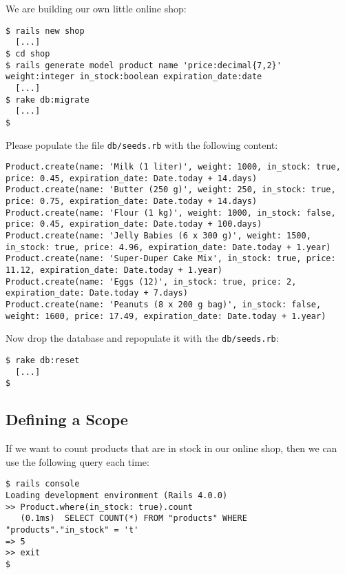 \documentclass[a4paper]{book}
\newcounter{tab}[chapter]
\begin{document}
We are building our own little online shop:

\begin{shaded}\begin{verbatim}
$ rails new shop
  [...]
$ cd shop
$ rails generate model product name 'price:decimal{7,2}' weight:integer in_stock:boolean expiration_date:date
  [...]
$ rake db:migrate
  [...]
$
\end{verbatim}\end{shaded}

Please populate the file \texttt{db/seeds.rb} with the following content:

\begin{shaded}\begin{verbatim}
Product.create(name: 'Milk (1 liter)', weight: 1000, in_stock: true, price: 0.45, expiration_date: Date.today + 14.days)
Product.create(name: 'Butter (250 g)', weight: 250, in_stock: true, price: 0.75, expiration_date: Date.today + 14.days)
Product.create(name: 'Flour (1 kg)', weight: 1000, in_stock: false, price: 0.45, expiration_date: Date.today + 100.days)
Product.create(name: 'Jelly Babies (6 x 300 g)', weight: 1500, in_stock: true, price: 4.96, expiration_date: Date.today + 1.year)
Product.create(name: 'Super-Duper Cake Mix', in_stock: true, price: 11.12, expiration_date: Date.today + 1.year)
Product.create(name: 'Eggs (12)', in_stock: true, price: 2, expiration_date: Date.today + 7.days)
Product.create(name: 'Peanuts (8 x 200 g bag)', in_stock: false, weight: 1600, price: 17.49, expiration_date: Date.today + 1.year)
\end{verbatim}\end{shaded}

Now drop the database and repopulate it with the \texttt{db/seeds.rb}:

\begin{shaded}\begin{verbatim}
$ rake db:reset
  [...]
$
\end{verbatim}\end{shaded}

\subsection{Defining a Scope}\label{defining-a-scope}

If we want to count products that are in stock in our online shop, then we can use the following query each time:

\begin{shaded}\begin{verbatim}
$ rails console
Loading development environment (Rails 4.0.0)
>> Product.where(in_stock: true).count
   (0.1ms)  SELECT COUNT(*) FROM "products" WHERE "products"."in_stock" = 't'
=> 5
>> exit
$
\end{verbatim}\end{shaded}
\end{document}
